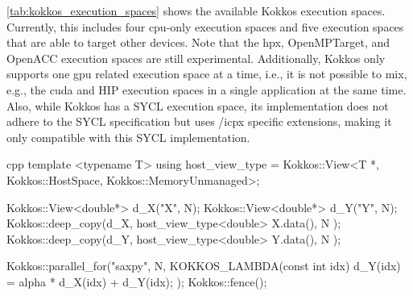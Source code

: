 \autoref{tab:kokkos_execution_spaces} shows the available Kokkos execution spaces. 
Currently, this includes four \gls{cpu}-only execution spaces and five execution spaces that are able to target other devices. 
Note that the \gls{hpx}, OpenMPTarget, and OpenACC execution spaces are still experimental. 
Additionally, Kokkos only supports one \gls{gpu} related execution space at a time, i.e., it is not possible to mix, e.g., the \gls{cuda} and HIP execution spaces in a single application at the same time. 
Also, while Kokkos has a SYCL execution space, its implementation does not adhere to the SYCL specification but uses \dpcpp/icpx specific extensions, making it only compatible with this SYCL implementation. 

\begin{listing}
    \begin{moderncode}{cpp}
template <typename T>
using host_view_type = Kokkos::View<T *, Kokkos::HostSpace, Kokkos::MemoryUnmanaged>;

Kokkos::View<double*> d_X("X", N);
Kokkos::View<double*> d_Y("Y", N);
Kokkos::deep_copy(d_X, host_view_type<double>{ X.data(), N });
Kokkos::deep_copy(d_Y, host_view_type<double>{ Y.data(), N });

Kokkos::parallel_for("saxpy", N, KOKKOS_LAMBDA(const int idx) {
    d_Y(idx) = alpha * d_X(idx) + d_Y(idx);
});
Kokkos::fence();


\end{moderncode}
\end{listing}
